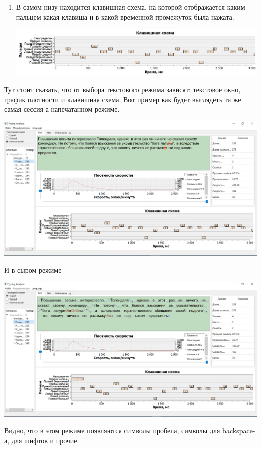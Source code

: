 \begin{enumerate}
\item В самом низу находится клавишная схема, на которой отображается каким пальцем какая клавиша и в какой временной промежуток была нажата.
\begin{center}
\includegraphics[scale=0.5]{Figures/DiagView.JPG}
\end{center}
\end{enumerate}
Тут стоит сказать, что от выбора текстового режима зависят: текстовое окно, график плотности и клавишная схема.
Вот пример как будет выглядеть та же самая сессия а напечатанном режиме.
\begin{center}
\includegraphics[scale=0.355]{Figures/appprint.JPG}
\end{center}
И в сыром режиме
\begin{center}
\includegraphics[scale=0.355]{Figures/appraw.JPG}
\end{center}
Видно, что в этом режиме появляются символы пробела, символы для backspace-а, для шифтов и прочие.

